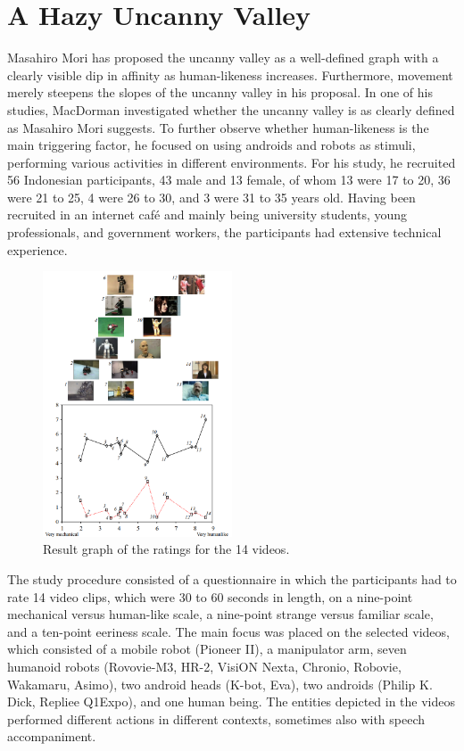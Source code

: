 \section{A Hazy Uncanny Valley}
Masahiro Mori has proposed the uncanny valley as a well-defined graph with a clearly visible dip in affinity as human-likeness increases. Furthermore, movement merely steepens the slopes of the uncanny valley in his proposal.
In one of his studies, MacDorman \cite{uncanny_ambiguous} investigated whether the uncanny valley is as clearly defined as Masahiro Mori suggests. To further observe whether human-likeness is the main triggering factor, he focused on using androids and robots as stimuli, performing various activities in different environments. For his study, he recruited 56 Indonesian participants, 43 male and 13 female, of whom 13 were 17 to 20, 36 were 21 to 25, 4 were 26 to 30, and 3 were 31 to 35  years old. Having been recruited in an internet café and mainly being university students, young professionals, and government workers, the participants had extensive technical experience.\newpage
\begin{figure} %
    \centering
    \includegraphics[width=0.5\textwidth]{graphics/hazy_uncanny.png}
    \caption{Result graph of the ratings for the 14 videos.}
    \label{fig:hazyUncanny}
\end{figure}
The study procedure consisted of a questionnaire in which the participants had to rate 14 video clips, which were 30 to 60 seconds in length, on a nine-point mechanical versus human-like scale, a nine-point strange versus familiar scale, and a ten-point eeriness scale. The main focus was placed on the selected videos, which consisted of a mobile robot (Pioneer II), a manipulator arm, seven humanoid robots (Rovovie-M3, HR-2, VisiON Nexta, Chronio, Robovie, Wakamaru, Asimo), two android heads (K-bot, Eva), two androids (Philip K. Dick, Repliee Q1Expo), and one human being. The entities depicted in the videos performed different actions in different contexts, sometimes also with speech accompaniment.\\
